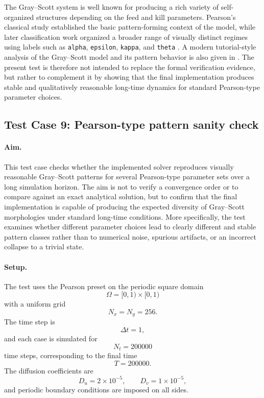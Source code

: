 The Gray--Scott system is well known for producing a rich variety of self-organized structures depending on the feed and kill parameters. Pearson's classical study established the basic pattern-forming context of the model, while later classification work organized a broader range of visually distinct regimes using labels such as \texttt{alpha}, \texttt{epsilon}, \texttt{kappa}, and \texttt{theta} \cite{pearson1993,munafo_gray_scott_classes}. A modern tutorial-style analysis of the Gray--Scott model and its pattern behavior is also given in \cite{gandy2022}. The present test is therefore not intended to replace the formal verification evidence, but rather to complement it by showing that the final implementation produces stable and qualitatively reasonable long-time dynamics for standard Pearson-type parameter choices.

\subsection{Test Case 9: Pearson-type pattern sanity check}
\label{sec:verification_testcase_pearson}

\paragraph{Aim.}
This test case checks whether the implemented solver reproduces visually reasonable Gray--Scott patterns for several Pearson-type parameter sets over a long simulation horizon. The aim is not to verify a convergence order or to compare against an exact analytical solution, but to confirm that the final implementation is capable of producing the expected diversity of Gray--Scott morphologies under standard long-time conditions. More specifically, the test examines whether different parameter choices lead to clearly different and stable pattern classes rather than to numerical noise, spurious artifacts, or an incorrect collapse to a trivial state.

\paragraph{Setup.}
The test uses the Pearson preset on the periodic square domain
\[
\Omega = [0,1)\times[0,1)
\]
with a uniform grid
\[
N_x = N_y = 256.
\]
The time step is
\[
\Delta t = 1,
\]
and each case is simulated for
\[
N_t = 200000
\]
time steps, corresponding to the final time
\[
T = 200000.
\]
The diffusion coefficients are
\[
D_u = 2\times 10^{-5}, \qquad D_v = 1\times 10^{-5},
\]
and periodic boundary conditions are imposed on all sides.

